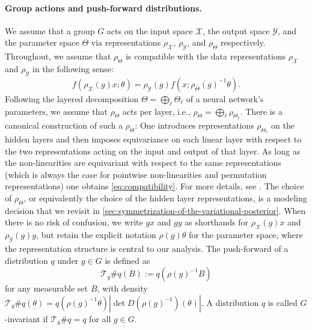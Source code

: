 \documentclass{article}
\begin{document}
\paragraph{Group actions and push-forward distributions.} We assume that a group $G$ acts on the input space $\mathcal{X}$, the output space $\mathcal{Y}$, and the parameter space $\Theta$ via representations $\rho_{\mathcal{X}}$, $\rho_{\mathcal{Y}}$, and $\rho_{\Theta}$ respectively.
Throughout, we assume that $\rho_{\Theta}$ is compatible with the data representations $\rho_{\mathcal{X}}$ and $\rho_{\mathcal{Y}}$ in the following sense:
\begin{equation} \label{eq:compatibility}
    f(\rho_\mathcal{X}(g)x;\theta) = \rho_\mathcal{Y}(g)f(x;\rho_\Theta(g)^{-1}\theta).
\end{equation}
Following the layered decomposition $\Theta = \bigoplus_{\ell} \Theta_{\ell}$ of a neural network's parameters, we assume that $\rho_{\Theta}$ acts per layer, i.e., $\rho_{\Theta} = \bigoplus_{\ell} \rho_{\Theta_{\ell}}$. There is a canonical construction of such a $\rho_\Theta$: One introduces representations $\rho_{\Theta_{\ell}}$ on the hidden layers and then imposes equivariance  on each linear layer with respect to the two representations acting on the input and output of that layer. As long as the non-linearities are equivariant with respect to the same representations (which is always the case for pointwise non-linearities and permutation representations) one obtains \eqref{eq:compatibility}. For more details, see \citet{nordenfors2025optimization}.
The choice of $\rho_{\Theta}$, or equivalently the choice of the hidden layer representations, is a modeling decision that we revisit in \cref{sec:symmetrization-of-the-variational-posterior}. When there is no risk of confusion, we write $gx$ and $gy$ as shorthands for $\rho_{\mathcal{X}}(g)x$ and $\rho_{\mathcal{Y}}(g)y$, but retain the explicit notation $\rho(g)\theta$ for the parameter space, where the representation structure is central to our analysis. The push-forward of a distribution $q$ under $g \in G$ is defined as
\begin{equation}
    \mathcal{T}_{g} \# q(B) := q(\rho(g)^{-1} B)
\end{equation}
for any measurable set $B$, with density
   $ \mathcal{T}_{g} \# q (\theta) = q(\rho(g)^{-1} \theta) \left|\det D(\rho(g)^{-1}) (\theta)\right|$.
A distribution $q$ is called $G$-invariant if $\mathcal{T}_{g} \# q = q$ for all $g \in G$.
\end{document}
